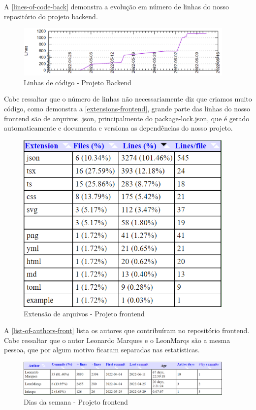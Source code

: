 A \autoref{lines-of-code-back} demonstra a evolução em número de linhas do nosso repositório do projeto backend.
\begin{figure}[H]
	\centering
	\caption{\label{lines-of-code-back}Linhas de código - Projeto Backend}
	\includegraphics[width=0.95\textwidth]{../imagens/stats/lines-of-code-backend.png}
\end{figure}

Cabe ressaltar que o número de linhas não necessariamente diz que criamos muito código, como demonstra a \autoref{extensions-frontend}, grande parte das linhas do nosso \gls{frontend} são de arquivos .json, principalmente do package-lock.json, que é gerado automaticamente e documenta e versiona as dependências do nosso projeto.
\begin{figure}[H]
	\centering
	\caption{\label{extensions-frontend}Extensão de arquivos - Projeto \gls{frontend}}
	\includegraphics[width=0.95\textwidth]{../imagens/stats/extensions-frontend.png}
\end{figure}

A \autoref{list-of-authors-front} lista os autores que contribuíram no repositório \gls{frontend}. Cabe ressaltar que o autor Leonardo Marques e o LeonMarqs são a mesma pessoa, que por algum motivo ficaram separadas nas estatísticas.
\begin{figure}[H]
	\centering
	\caption{\label{list-of-authors-front}Dias da semana - Projeto \gls{frontend}}
	\includegraphics[width=0.95\textwidth]{../imagens/stats/list-of-authors-frontend.png}
\end{figure}

